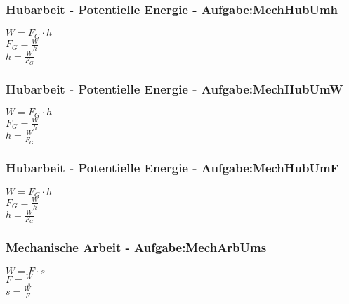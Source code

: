 \subsubsection{Hubarbeit - Potentielle Energie - Aufgabe:MechHubUmh} 
\begin{minipage}{0.45\textwidth} 
$ W = F_{G} \cdot h $\\ 
$ F_{G}  = \frac{W}{h} $\\ 
$ h = \frac{W}{F_{G} } $\\ 
\end{minipage} 
\begin{minipage}{0.45\textwidth} 
 
\end{minipage} 
\subsubsection{Hubarbeit - Potentielle Energie - Aufgabe:MechHubUmW} 
\begin{minipage}{0.45\textwidth} 
$ W = F_{G} \cdot h $\\ 
$ F_{G}  = \frac{W}{h} $\\ 
$ h = \frac{W}{F_{G} } $\\ 
\end{minipage} 
\begin{minipage}{0.45\textwidth} 
 
\end{minipage} 
\subsubsection{Hubarbeit - Potentielle Energie - Aufgabe:MechHubUmF} 
\begin{minipage}{0.45\textwidth} 
$ W = F_{G} \cdot h $\\ 
$ F_{G}  = \frac{W}{h} $\\ 
$ h = \frac{W}{F_{G} } $\\ 
\end{minipage} 
\begin{minipage}{0.45\textwidth} 
 
\end{minipage} 
\subsubsection{Mechanische Arbeit - Aufgabe:MechArbUms} 
\begin{minipage}{0.45\textwidth} 
$ W = F\cdot s $\\ 
$ F = \frac{W}{s} $\\ 
$ s = \frac{W}{F} $\\ 
\end{minipage} 
\begin{minipage}{0.45\textwidth} 
 
\end{minipage} 
